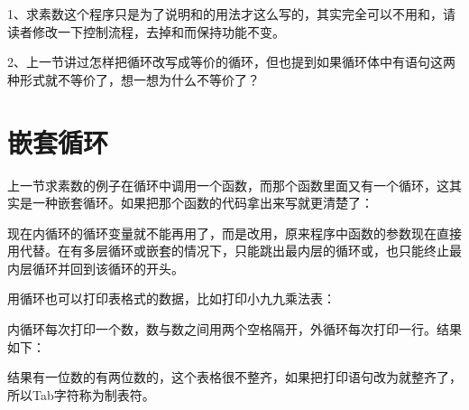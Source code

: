 1、求素数这个程序只是为了说明和的用法才这么写的，其实完全可以不用和，请读者修改一下控制流程，去掉和而保持功能不变。



2、上一节讲过怎样把循环改写成等价的循环，但也提到如果循环体中有语句这两种形式就不等价了，想一想为什么不等价了？




\section{嵌套循环}
%
上一节求素数的例子在循环中调用一个函数，而那个函数里面又有一个循环，这其实是一种嵌套循环。如果把那个函数的代码拿出来写就更清楚了：





现在内循环的循环变量就不能再用了，而是改用，原来程序中函数的参数现在直接用代替。在有多层循环或嵌套的情况下，只能跳出最内层的循环或，也只能终止最内层循环并回到该循环的开头。



用循环也可以打印表格式的数据，比如打印小九九乘法表：





内循环每次打印一个数，数与数之间用两个空格隔开，外循环每次打印一行。结果如下：




结果有一位数的有两位数的，这个表格很不整齐，如果把打印语句改为就整齐了，所以Tab字符称为制表符。


